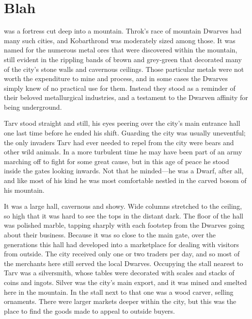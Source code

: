 \chapter{Blah}


was a fortress cut deep into a mountain.  Throk's race of mountain Dwarves had many such cities, and Kobarthrond was moderately sized among those.  It was named for the numerous metal ores that were discovered within the mountain, still evident in the rippling bands of brown and grey-green that decorated many of the city's stone walls and cavernous ceilings.  Those particular metals were not worth the expenditure to mine and process, and in some cases the Dwarves simply knew of no practical use for them.  Instead they stood as a reminder of their beloved metallurgical industries, and a testament to the Dwarven affinity for being underground.



Tarv stood straight and still, his eyes peering over the city's main entrance hall one last time before he ended his shift.  Guarding the city was usually uneventful; the only invaders Tarv had ever needed to repel from the city were bears and other wild animals.  In a more turbulent time he may have been part of an army marching off to fight for some great cause, but in this age of peace he stood inside the gates looking inwards.  Not that he minded---he was a Dwarf, after all, and like most of his kind he was most comfortable nestled in the carved bosom of his mountain.

It was a large hall, cavernous and showy.  Wide columns stretched to the ceiling, so high that it was hard to see the tops in the distant dark.  The floor of the hall was polished marble, tapping sharply with each footstep from the Dwarves going about their business.  Because it was so close to the main gate, over the generations this hall had developed into a marketplace for dealing with visitors from outside.  The city received only one or two traders per day, and so most of the merchants here still served the local Dwarves.  Occupying the stall nearest to Tarv was a silversmith, whose tables were decorated with scales and stacks of coins and ingots.  Silver was the city's main export, and it was mined and smelted here in the mountain.  In the stall next to that one was a wood carver, selling ornaments.  There were larger markets deeper within the city, but this was the place to find the goods made to appeal to outside buyers.

